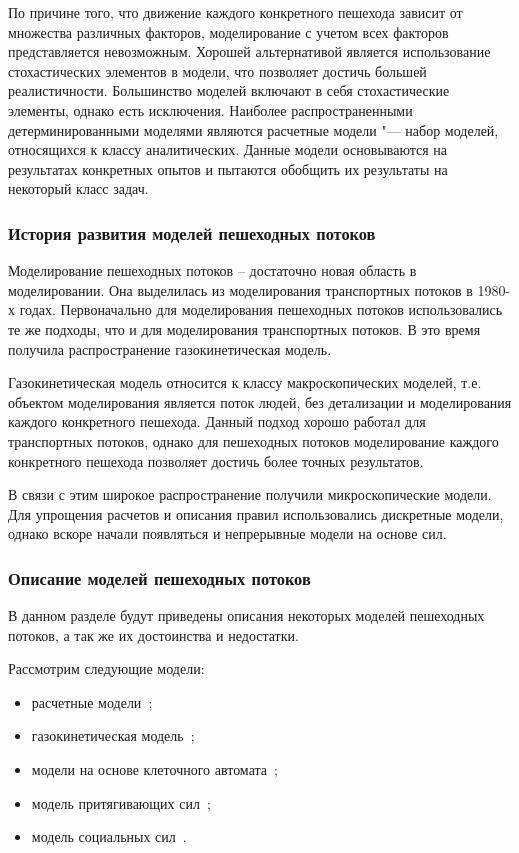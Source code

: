 По причине того, что движение каждого конкретного пешехода зависит от множества различных факторов, моделирование с учетом всех факторов представляется невозможным.
Хорошей альтернативой является использование стохастических элементов в модели, что позволяет достичь большей реалистичности.
Большинство моделей включают в себя стохастические элементы, однако есть исключения.
Наиболее распространенными детерминированными моделями являются расчетные модели "--- набор моделей, относящихся к классу аналитических.
Данные модели основываются на результатах конкретных опытов и пытаются обобщить их результаты на некоторый класс задач.


\subsubsection{История развития моделей пешеходных потоков}
\label{sub:domain:models:history}

Моделирование пешеходных потоков – достаточно новая область в моделировании. Она выделилась из моделирования транспортных потоков в 1980-х годах.
Первоначально для моделирования пешеходных потоков использовались те же подходы, что и для моделирования транспортных потоков.
В это время получила распространение газокинетическая модель.

Газокинетическая модель относится к классу макроскопических моделей, т.е. объектом моделирования является поток людей, без детализации и моделирования каждого конкретного пешехода.
Данный подход хорошо работал для транспортных потоков, однако для пешеходных потоков моделирование каждого конкретного пешехода позволяет достичь более точных результатов.

В связи с этим широкое распространение получили микроскопические модели. Для упрощения расчетов и описания правил использовались дискретные модели, однако вскоре начали появляться и непрерывные модели на основе сил.

\subsubsection{Описание моделей пешеходных потоков}
\label{sub:domain:models:descriptions}

В данном разделе будут приведены описания некоторых моделей пешеходных потоков, а так же их достоинства и недостатки.

Рассмотрим следующие модели:

\begin{itemize}
  \item расчетные модели~\cite{gost_fire_safety};
  \item газокинетическая модель~\cite{helbing_fluid};
  \item модели на основе клеточного автомата~\cite{adler_cellular};
  \item модель притягивающих сил~\cite{okazakia_magnetic_force};
  \item модель социальных сил~\cite{helbing_social_force}.
\end{itemize}

